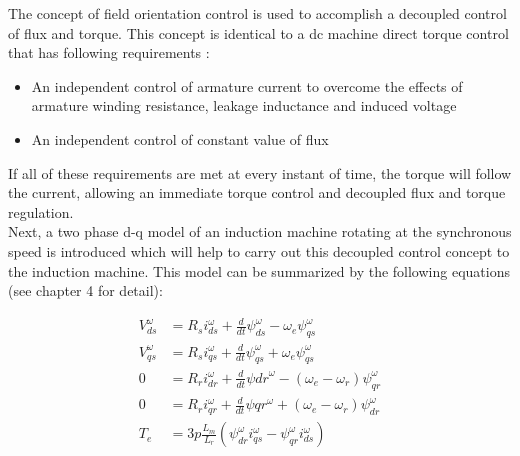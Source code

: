 The concept of field orientation control is used to accomplish a decoupled control of flux and torque. This concept is identical to a dc machine direct torque control that has following requirements \cite{Lipo}:
\begin{itemize}
\item{An independent control of armature current to overcome the effects of armature winding resistance, leakage inductance and induced voltage}
\item{An independent control of constant value of flux}
\end{itemize}

If all of these requirements are met at every instant of time, the torque will follow the current, allowing an immediate torque control and decoupled flux and torque regulation.\\

Next, a two phase d-q model of an induction machine rotating at the synchronous speed is introduced which will help to carry out this decoupled control concept to the induction machine. This model can be summarized by the following equations (see chapter 4 for detail):

\begin{align}
V_{ds}^{\omega}&=R_{s}i_{ds}^{\omega}+\frac{d}{dt}\psi_{ds}^{\omega}-\omega_{e}\psi_{qs}^{\omega}\\
V_{qs}^{\omega}&=R_{s}i_{qs}^{\omega}+\frac{d}{dt}\psi_{qs}^{\omega}+\omega_{e}\psi_{qs}^{\omega}\\
0&=R_{r}i_{dr}^{\omega}+\frac{d}{dt}\psi{dr}^{\omega}-(\omega_{e}-\omega_{r})\psi_{qr}^{\omega}\\
0&=R_{r}i_{qr}^{\omega}+\frac{d}{dt}\psi{qr}^{\omega}+(\omega_{e}-\omega_{r})\psi_{dr}^{\omega}\\
T_{e}&=3p\frac{L_{m}}{L_{r}}(\psi_{dr}^{\omega}i_{qs}^{\omega}-\psi_{qr}^{\omega}i_{ds}^{\omega})
\end{align}

